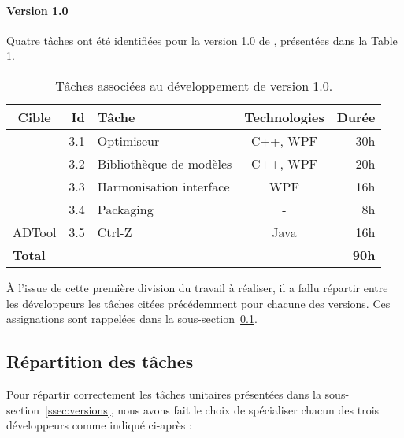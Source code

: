 \paragraph{Version 1.0} Quatre tâches ont été identifiées pour la version 1.0 de \glasir{}, présentées dans la {\sc Table} \ref{tab:taches_units_3}.
            \begin{table}[h]
                \centering
                \begin{tabular}{|c|r|l|c|r|}
                    \hline
                    \textbf{Cible} & \textbf{Id} & \textbf{Tâche} & \textbf{Technologies} & \textbf{Durée}\\
                    \hline

                    \multirow{4}{*}{\glasir{}} & 3.1 & Optimiseur & C++, WPF & 30h\\
                    \cline{2-5}
                     & 3.2 & Bibliothèque de modèles & C++, WPF & 20h\\
                    \cline{2-5}
                     & 3.3 & Harmonisation interface & WPF & 16h\\
                    \cline{2-5}
                     & 3.4 & Packaging & - & 8h\\
                    \hline

                    \multirow{1}{*}{ADTool} & 3.5 & Ctrl-Z & \multirow{1}{*}{Java} & 16h\\
                    \hline

                    \multicolumn{4}{|l|}{\bf Total} & {\bf 90h}\\
                    \hline
                \end{tabular}
                \caption{Tâches associées au développement de \glasir{} version 1.0.}
                \label{tab:taches_units_3}
            \end{table}

À l'issue de cette première division du travail à réaliser, il a fallu répartir entre les développeurs les tâches citées précédemment pour chacune des versions. Ces assignations sont rappelées dans la {\sc sous-section}~\ref{ssec:repartition}.

\subsection{Répartition des tâches}
\label{ssec:repartition}

Pour répartir correctement les tâches unitaires présentées dans la {\sc sous-section}~\ref{ssec:versions}, nous avons fait le choix de \og spécialiser \fg{} chacun des trois développeurs comme indiqué ci-après :

